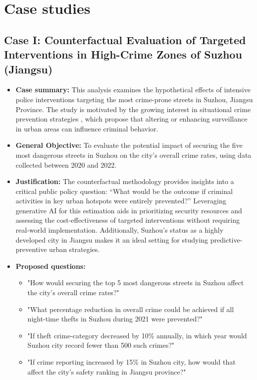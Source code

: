 
\section{Case studies}

\subsection{Case I: Counterfactual Evaluation of Targeted Interventions in High-Crime Zones of Suzhou (Jiangsu)}

\begin{itemize}
    \item \textbf{Case summary:} This analysis examines the hypothetical effects of intensive police interventions targeting the most crime-prone streets in Suzhou, Jiangsu Province. The study is motivated by the growing interest in situational crime prevention strategies \cite{clarke1995situational}, which propose that altering or enhancing surveillance in urban areas can influence criminal behavior. 
        \item \textbf{General Objective:} To evaluate the potential impact of securing the five most dangerous streets in Suzhou on the city’s overall crime rates, using data collected between 2020 and 2022.
        \item \textbf{Justification:} The counterfactual methodology provides insights into a critical public policy question: “What would be the outcome if criminal activities in key urban hotspots were entirely prevented?” Leveraging generative AI for this estimation aids in prioritizing security resources and assessing the cost-effectiveness of targeted interventions without requiring real-world implementation. Additionally, Suzhou’s status as a highly developed city in Jiangsu makes it an ideal setting for studying predictive-preventive urban strategies.
        \item \textbf{Proposed questions:}
        \begin{itemize}
            \item "How would securing the top 5 most dangerous streets in Suzhou affect the city’s overall crime rates?"
            \item "What percentage reduction in overall crime could be achieved if all night-time thefts in Suzhou during 2021 were prevented?"
            \item "If theft crime-category decreased by 10\% annually, in which year would Suzhou city record fewer than 500 such crimes?"
            \item "If crime reporting increased by 15\% in Suzhou city, how would that affect the city's safety ranking in Jiangsu province?"
        \end{itemize}




\end{itemize}


